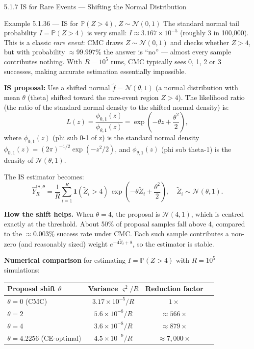 \documentclass[aspectratio=169,10pt]{beamer}
\begin{document}
\begin{frame}[allowframebreaks]{5.1.7 IS for Rare Events --- Shifting the Normal Distribution}

\begin{exampleblock}{Example 5.1.36 --- IS for $\mathbb{P}(Z > 4)$, $Z \sim \mathcal{N}(0,1)$}
  The standard normal tail probability $I = \mathbb{P}(Z > 4)$ is very small:
  $I \approx 3.167\times10^{-5}$ (roughly 3 in 100{,}000).
  This is a classic \emph{rare event}: CMC draws $Z \sim \mathcal{N}(0,1)$
  and checks whether $Z > 4$, but with probability $\approx 99.997\%$ the
  answer is ``no'' --- almost every sample contributes nothing.
  With $R = 10^5$ runs, CMC typically sees 0, 1, 2 or 3 successes,
  making accurate estimation essentially impossible.

  \medskip
  \textbf{IS proposal:} Use a shifted normal $\tilde{f} = \mathcal{N}(\theta, 1)$
  (a normal distribution with mean $\theta$ (theta) shifted toward the
  rare-event region $Z > 4$).
  The likelihood ratio (the ratio of the standard normal density to the
  shifted normal density) is:
  \[
    L(z) = \frac{\phi_{0,1}(z)}{\phi_{\theta,1}(z)}
    = \exp\!\left(-\theta z + \frac{\theta^2}{2}\right),
  \]
  where $\phi_{0,1}(z)$ (phi sub 0-1 of z) is the standard normal density
  $\phi_{0,1}(z) = (2\pi)^{-1/2}\exp(-z^2/2)$, and $\phi_{\theta,1}(z)$
  (phi sub theta-1) is the density of $\mathcal{N}(\theta,1)$.

  The IS estimator becomes:
  \[
    \hat{Y}_R^{\mathrm{IS},\theta}
    = \frac{1}{R}\sum_{i=1}^R
    \mathbf{1}(\tilde{Z}_i > 4)\,\exp\!\left(-\theta\tilde{Z}_i + \frac{\theta^2}{2}\right),
    \quad \tilde{Z}_i \sim \mathcal{N}(\theta,1).
  \]
\end{exampleblock}

\framebreak

\textbf{How the shift helps.}
When $\theta = 4$, the proposal is $\mathcal{N}(4,1)$, which is centred
exactly at the threshold.  About 50\% of proposal samples fall above 4,
compared to the $\approx 0.003\%$ success rate under CMC.
Each such sample contributes a non-zero (and reasonably sized) weight
$e^{-4\tilde{Z}_i + 8}$, so the estimator is stable.

\medskip
\textbf{Numerical comparison} for estimating $I = \mathbb{P}(Z > 4)$
with $R = 10^5$ simulations:

\begin{center}\small
  \begin{tabular}{lccc}
    \toprule
    Proposal shift $\theta$ & Variance $\varsigma^2/R$ & Reduction factor \\
    \midrule
    $\theta = 0$ (CMC) & $3.17\times10^{-5}/R$ & $1\times$ \\
    $\theta = 2$ & $5.6\times10^{-8}/R$ & $\approx 566\times$ \\
    $\theta = 4$ & $3.6\times10^{-8}/R$ & $\approx 879\times$ \\
    $\theta = 4.2256$ (CE-optimal) & $4.5\times10^{-9}/R$ & $\approx 7{,}000\times$ \\
    \bottomrule
  \end{tabular}
\end{center}


\end{frame}
\end{document}
